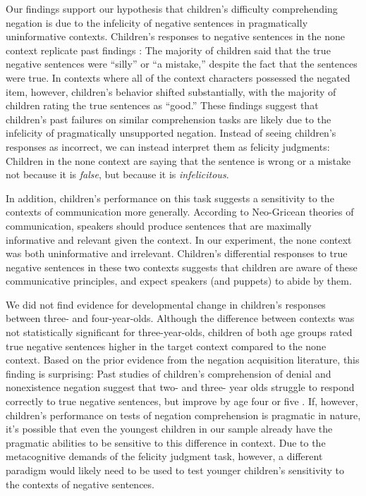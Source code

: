 \documentclass[man, noapacite]{apa2}
\begin{document}
Our findings support our hypothesis that children's difficulty comprehending negation is due to the infelicity of negative sentences in pragmatically uninformative contexts. Children's responses to negative sentences in the none context replicate past findings \cite{kim1985}: The majority of children said that the true negative sentences were ``silly'' or ``a mistake,'' despite the fact that the sentences were true. In contexts where all of the context characters possessed the negated item, however, children's behavior shifted substantially, with the majority of children rating the true sentences as ``good.'' These findings suggest that children's past failures on similar comprehension tasks are likely due to the infelicity of pragmatically unsupported negation. Instead of seeing children's responses as incorrect, we can instead interpret them as felicity judgments: Children in the none context are saying that the sentence is wrong or a mistake not because it is \emph{false}, but because it is \emph{infelicitous}.

In addition, children's performance on this task suggests a sensitivity to the contexts of communication more generally. According to Neo-Gricean theories of communication, speakers should produce sentences that are maximally informative and relevant given the context. In our experiment, the none context was both uninformative and irrelevant. Children's differential responses to true negative sentences in these two contexts suggests that children are aware of these communicative principles, and expect speakers (and puppets) to abide by them.

We did not find evidence for developmental change in children's responses between three- and four-year-olds. Although the difference between contexts was not statistically significant for three-year-olds, children of both age groups rated true negative sentences higher in the target context compared to the none context. Based on the prior evidence from the negation acquisition literature, this finding is surprising: Past studies of children's comprehension of denial and nonexistence negation suggest that two- and three- year olds struggle to respond correctly to true negative sentences, but improve by age four or five \cite{kim1985, nordmeyer2014b}. If, however, children's performance on tests of negation comprehension is pragmatic in nature, it's possible that even the youngest children in our sample already have the pragmatic abilities to be sensitive to this difference in context. Due to the metacognitive demands of the felicity judgment task, however, a different paradigm would likely need to be used to test younger children's sensitivity to the contexts of negative sentences.
\end{document}
